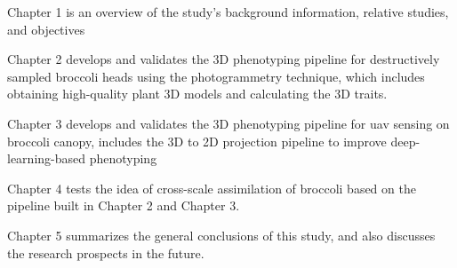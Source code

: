 Chapter 1 is an overview of the study's background information, relative studies, and objectives

Chapter 2 develops and validates the 3D phenotyping pipeline for destructively sampled broccoli heads using the photogrammetry technique, which includes obtaining high-quality plant 3D models and calculating the 3D traits.


Chapter 3 develops and validates the 3D phenotyping pipeline for \gls{uav} sensing on broccoli canopy, includes the 3D to 2D projection pipeline to improve deep-learning-based phenotyping

Chapter 4 tests the idea of cross-scale assimilation of broccoli based on the pipeline built in Chapter 2 and Chapter 3.

Chapter 5 summarizes the general conclusions of this study, and also discusses the research prospects in the future.